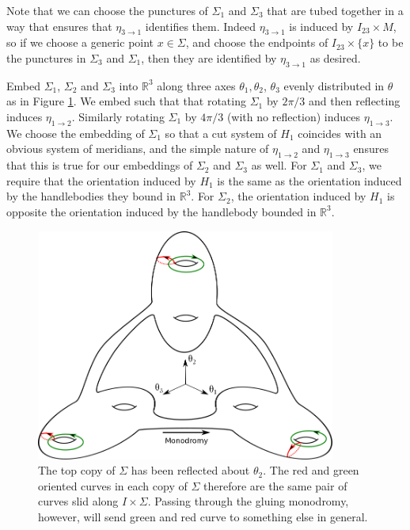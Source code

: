 \documentclass[12pt]{amsart}
\newcommand{\R}{\mathbb{R}}
\theoremstyle{definition}
\theoremstyle{remark}
\begin{document}
Note that we can choose the punctures of $\Sigma_1$ and $\Sigma_3$ that are tubed together in a way that ensures that $\eta_{3 \to 1}$ identifies them.
Indeed $\eta_{3 \to 1}$ is induced by $I_{23} \times M$, so if we choose a generic point $x \in \Sigma$, and choose the endpoints of $I_{23} \times \{x\}$ to be the punctures in $\Sigma_3$ and $\Sigma_1$, then they are identified by $\eta_{3 \to 1}$ as desired.

Embed $\Sigma_1$, $\Sigma_2$ and $\Sigma_3$ into $\R^3$ along three axes $\theta_1,\theta_2$, $\theta_3$ evenly distributed in $\theta$ as in Figure \ref{embeddingsigmas}.
We embed such that that rotating $\Sigma_1$ by $2\pi/3$ and then reflecting induces $\eta_{1 \to 2}$.
Similarly rotating $\Sigma_1$ by $4\pi/3$ (with no reflection) induces $\eta_{1 \to 3}$.
We choose the embedding of $\Sigma_1$ so that a cut system of $H_1$ coincides with an obvious system of meridians, and the simple nature of $\eta_{1 \to 2}$ and $\eta_{1 \to 3}$ ensures that this is true for our embeddings of $\Sigma_2$ and $\Sigma_3$ as well.
For $\Sigma_1$ and $\Sigma_3$, we require that the orientation induced by $H_1$ is the same as the orientation induced by the handlebodies they bound in $\R^3$.
For $\Sigma_2$, the orientation induced by $H_1$ is opposite the orientation induced by the handlebody bounded in $\R^3$.

\begin{figure}[h]
\centering
\includegraphics[height=3in]{sigmas.png}
\caption{  The top copy of $\Sigma$ has been reflected about $\theta_2$.
The red and green oriented curves in each copy of $\Sigma$ therefore are the same pair of curves slid along $I \times \Sigma$.
Passing through the gluing monodromy, however, will send green and red curve to something else in general.}
\label{embeddingsigmas}
\end{figure}
\end{document}
